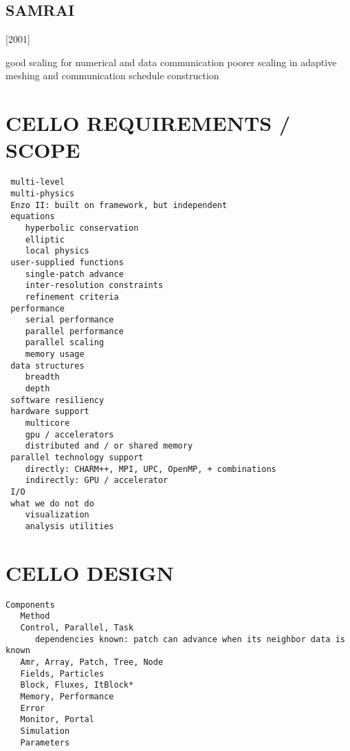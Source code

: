 \documentclass[14pt,letter]{article}
\begin{document}
\subsection{SAMRAI}

[2001]


good scaling for numerical and data communication
poorer scaling in adaptive meshing and communication schedule construction 


\section{CELLO REQUIREMENTS / SCOPE} \label{s:requirements}

\begin{verbatim}
 multi-level
 multi-physics
 Enzo II: built on framework, but independent
 equations
    hyperbolic conservation
    elliptic
    local physics
 user-supplied functions
    single-patch advance
    inter-resolution constraints
    refinement criteria
 performance
    serial performance
    parallel performance
    parallel scaling
    memory usage
 data structures
    breadth
    depth
 software resiliency
 hardware support
    multicore
    gpu / accelerators
    distributed and / or shared memory
 parallel technology support
    directly: CHARM++, MPI, UPC, OpenMP, + combinations
    indirectly: GPU / accelerator
 I/O
 what we do not do
    visualization
    analysis utilities
\end{verbatim}

\section{CELLO DESIGN} \label{s:design}

\begin{verbatim}
Components
   Method
   Control, Parallel, Task
      dependencies known: patch can advance when its neighbor data is known
   Amr, Array, Patch, Tree, Node 
   Fields, Particles
   Block, Fluxes, ItBlock*
   Memory, Performance
   Error
   Monitor, Portal
   Simulation
   Parameters
\end{verbatim}
\end{document}
